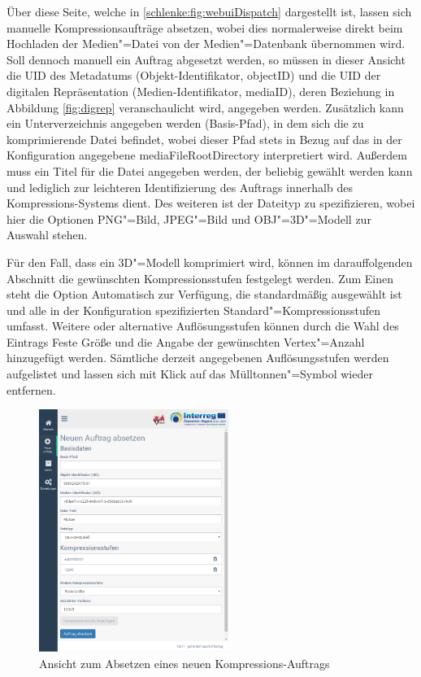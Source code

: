 Über diese Seite, welche in \autoref{schlenke:fig:webuiDispatch} dargestellt ist, lassen sich manuelle Kompressionsaufträge absetzen, wobei dies normalerweise direkt beim Hochladen der Medien"=Datei von der Medien"=Datenbank übernommen wird. Soll dennoch manuell ein Auftrag abgesetzt werden, so müssen in dieser Ansicht die UID des Metadatums (Objekt-Identifikator, {\ttfamily objectID}) und die UID der digitalen Repräsentation (Medien-Identifikator, {\ttfamily mediaID}), deren Beziehung in Abbildung \autoref{fig:digrep} veranschaulicht wird, angegeben werden. Zusätzlich kann ein Unterverzeichnis angegeben werden (Basis-Pfad), in dem sich die zu komprimierende Datei befindet, wobei dieser Pfad stets in Bezug auf das in der Konfiguration angegebene {\ttfamily media\-File\-Root\-Directory} interpretiert wird. Außerdem muss ein Titel für die Datei angegeben werden, der beliebig gewählt werden kann und lediglich zur leichteren Identifizierung des Auftrags innerhalb des Kompressions-Systems dient. Des weiteren ist der Dateityp zu spezifizieren, wobei hier die Optionen PNG"=Bild, JPEG"=Bild und OBJ"=3D"=Modell zur Auswahl stehen. 

Für den Fall, dass ein 3D"=Modell komprimiert wird, können im darauffolgenden Abschnitt die gewünschten Kompressionsstufen festgelegt werden. Zum Einen steht die Option \glqq{}Automatisch\grqq{} zur Verfügung, die standardmäßig ausgewählt ist und alle in der Konfiguration spezifizierten Standard"=Kompressionsstufen umfasst. Weitere oder alternative Auflösungsstufen können durch die Wahl des Eintrags \glqq{}Feste Größe\grqq{} und die Angabe der gewünschten Vertex"=Anzahl hinzugefügt werden. Sämtliche derzeit angegebenen Auflösungsstufen werden aufgelistet und lassen sich mit Klick auf das Mülltonnen"=Symbol wieder entfernen.

\begin{figure}
\begin{center}
\includegraphics[width=0.55\textwidth]{Figures/schlenker/webui/dispatch2.png}
\caption{Ansicht zum Absetzen eines neuen Kompressions-Auftrags}
\label{schlenke:fig:webuiDispatch}
\end{center}
\end{figure}

